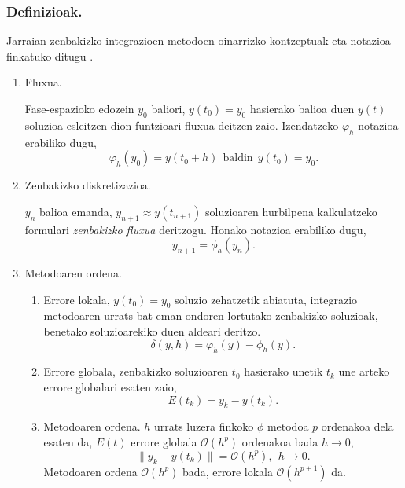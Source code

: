 \subsubsection*{Definizioak.}  
Jarraian zenbakizko integrazioen metodoen oinarrizko kontzeptuak eta notazioa finkatuko ditugu \cite{Corless2013,Hairer2006}.
\begin{enumerate}
\item Fluxua.

Fase-espazioko edozein $y_0$ baliori, $y(t_0)=y_0$ hasierako balioa duen $y(t)$ soluzioa esleitzen dion funtzioari fluxua deitzen zaio. Izendatzeko $\varphi_h$ notazioa erabiliko dugu,
\begin{equation*}
\label{eq:fluxua}
\varphi_h(y_0)=y(t_0+h) \ \ \mbox{baldin}  \ \  y(t_0)=y_0.
\end{equation*}

\item Zenbakizko diskretizazioa.

$y_{n}$ balioa emanda, $y_{n+1}\approx y(t_{n+1})$ soluzioaren hurbilpena kalkulatzeko formulari \emph{zenbakizko fluxua} deritzogu. Honako notazioa erabiliko dugu,
\begin{equation}
\label{eq:204}
y_{n+1}=\phi_h(y_{n}).
\end{equation}

\item Metodoaren ordena.

\begin{enumerate}
\item Errore lokala,  $y(t_0)=y_0$ soluzio zehatzetik abiatuta, integrazio metodoaren urrats bat eman ondoren lortutako zenbakizko soluzioak, benetako soluzioarekiko duen aldeari deritzo.
\begin{equation*}
\label{eq:le}
\delta(y,h)=\varphi_h(y)-\phi_h(y).
\end{equation*}   


\item Errore globala, zenbakizko soluzioaren $t_0$ hasierako unetik $t_k$ une arteko errore globalari esaten zaio,
\begin{equation*}
 \label{eq:ge}
E(t_k)=y_k-y(t_k).
\end{equation*}  

\item Metodoaren ordena. $h$ urrats luzera finkoko $\phi$ metodoa $p$ ordenakoa dela esaten da, $E(t)$ errore globala $\mathcal{O}(h^{p})$ ordenakoa bada  $h \rightarrow 0$,
\begin{equation*} 
\label{eq:metordena}
\|y_k-y(t_k)\|=\mathcal{O}(h^{p}), \ \ h \rightarrow 0.
\end{equation*} 
Metodoaren ordena $\mathcal{O}(h^p)$ bada, errore lokala $\mathcal{O}(h^{p+1})$ da.


\end{enumerate}
\end{enumerate}
